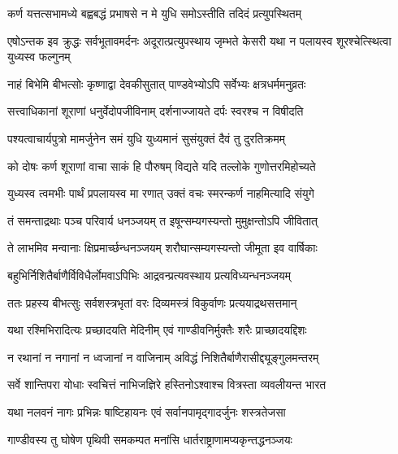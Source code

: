 


\twolineshloka
{कर्ण यत्तत्सभामध्ये बह्वबद्धं प्रभाषसे}
{न मे युधि समोऽस्तीति तदिदं प्रत्युपस्थितम्}


\threelineshloka
{एषोऽन्तक इव क्रुद्धः सर्वभूतावमर्दनः}
{अदूरात्प्रत्युपस्थाय जृम्भते केसरी यथा}
{न पलायस्व शूरश्चेत्स्थित्वा युध्यस्व फल्गुनम्}




\twolineshloka
{नाहं बिभेमि बीभत्सोः कृष्णाद्वा देवकीसुतात्}
{पाण्डवेभ्योऽपि सर्वेभ्यः क्षत्रधर्ममनुव्रतः}


\twolineshloka
{सत्त्वाधिकानां शूराणां धनुर्वेदोपजीविनाम्}
{दर्शनाज्जायते दर्पः स्वरश्च न विषीदति}


\twolineshloka
{पश्यत्वाचार्यपुत्रो मामर्जुनेन समं युधि}
{युध्यमानं सुसंयुक्तं दैवं तु दुरतिक्रमम्}




\twolineshloka
{को दोषः कर्ण शूराणां वाचा साकं हि पौरुषम्}
{विद्यते यदि तल्लोके गुणोत्तरमिहोच्यते}


\twolineshloka
{युध्यस्व त्वमभीः पार्थं प्रपलायस्व मा रणात्}
{उक्तं वचः स्मरन्कर्ण नाहमित्यादि संयुगे}



\twolineshloka
{तं समन्ताद्रथाः पञ्च परिवार्य धनञ्जयम्}
{त इषून्सम्यगस्यन्तो मुमुक्षन्तोऽपि जीवितात्}


\twolineshloka
{ते लाभमिव मन्वानाः क्षिप्रमार्च्छन्धनञ्जयम्}
{शरौघान्सम्यगस्यन्तो जीमूता इव वार्षिकाः}


\twolineshloka
{बहुभिर्निशितैर्बाणैर्विविधैर्लोमवाऽपिभिः}
{आद्रवन्प्रत्यवस्थाय प्रत्यविध्यन्धनञ्जयम्}


\twolineshloka
{ततः प्रहस्य बीभत्सुः सर्वशस्त्रभृतां वरः}
{दिव्यमस्त्रं विकुर्वाणः प्रत्ययाद्रथसत्तमान्}


\twolineshloka
{यथा रश्मिभिरादित्यः प्रच्छादयति मेदिनीम्}
{एवं गाण्डीवनिर्मुक्तैः शरैः प्राच्छादयद्दिशः}


\twolineshloka
{न रथानां न नगानां न ध्वजानां न वाजिनाम्}
{अविद्धं निशितैर्बाणैरासीद्द्यूङ्गुलमन्तरम्}


\twolineshloka
{सर्वे शान्तिपरा योधाः स्वचित्तं नाभिजज्ञिरे}
{हस्तिनोऽश्वाश्च वित्रस्ता व्यवलीयन्त भारत}


\twolineshloka
{यथा नलवनं नागः प्रभिन्नः षाष्टिहायनः}
{एवं सर्वानपामृद्गादर्जुनः शस्त्रतेजसा}


\twolineshloka
{गाण्डीवस्य तु घोषेण पृथिवी समकम्पत}
{मनांसि धार्तराष्ट्राणामप्यकृन्तद्धनञ्जयः}


